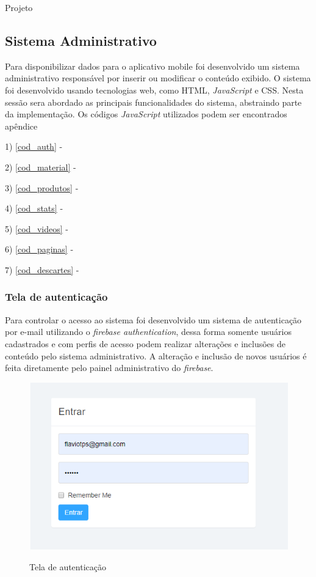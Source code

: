 \documentclass[
	12pt,				%
	openright,			%
	twoside,			%
	a4paper,			%
	english,			%
	french,				%
	spanish,			%
	brazil				%
	]{abntex2}
\begin{document}
\begin{chapter}{Projeto}
\newpage
\subsection{Sistema Administrativo} \label{Sistema Administrativo}
Para disponibilizar dados para o aplicativo mobile foi desenvolvido um sistema administrativo responsável por inserir ou modificar o conteúdo exibido. O sistema foi desenvolvido usando tecnologias web, como HTML, \textit{JavaScript} e CSS. Nesta sessão sera abordado as principais funcionalidades do sistema, abstraindo parte da implementação. Os códigos \textit{JavaScript} utilizados podem ser encontrados apêndice 

1) \autoref{cod_auth} -  

2) \autoref{cod_material} -  

3) \autoref{cod_produtos} -  

4) \autoref{cod_stats} -  

5) \autoref{cod_videos} -  

6) \autoref{cod_paginas} -  

7) \autoref{cod_descartes} -  

\newpage
\subsubsection{Tela de autenticação} \label{tela_auth}
Para controlar o acesso ao sistema foi desenvolvido um sistema de autenticação por e-mail utilizando o \textit{firebase authentication}, dessa forma somente usuários cadastrados e com perfis de acesso podem realizar alterações e inclusões de conteúdo pelo sistema administrativo. 
A alteração e inclusão de novos usuários é feita diretamente pelo painel administrativo do \textit{firebase}.


\begin{figure}[h]
\centering
   \caption{Tela de autenticação}
   \includegraphics[scale=0.85]{media/tela_login_site_1.png}
     \label{fig:tela_login_site_1}
\end{figure}


\end{chapter}
\end{document}
